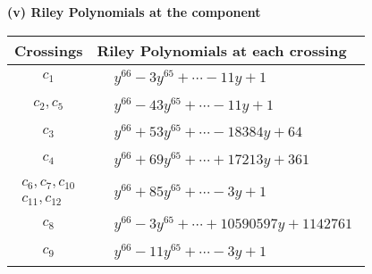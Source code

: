 \documentclass[1p]{elsarticle_modified}
\theoremstyle{definition}
\begin{document}
\newpage\renewcommand{\arraystretch}{1}
\flushleft \textbf{(v) Riley Polynomials at the component}\newline \\
\begin{tabular}{m{50pt}|m{274pt}}
Crossings & \hspace{64pt}Riley Polynomials at each crossing \\
\hline $$\begin{aligned}c_{1}\end{aligned}$$&$\begin{aligned}
&y^{66}-3 y^{65}+\cdots-11 y+1
\end{aligned}$\\
\hline $$\begin{aligned}c_{2},c_{5}\end{aligned}$$&$\begin{aligned}
&y^{66}-43 y^{65}+\cdots-11 y+1
\end{aligned}$\\
\hline $$\begin{aligned}c_{3}\end{aligned}$$&$\begin{aligned}
&y^{66}+53 y^{65}+\cdots-18384 y+64
\end{aligned}$\\
\hline $$\begin{aligned}c_{4}\end{aligned}$$&$\begin{aligned}
&y^{66}+69 y^{65}+\cdots+17213 y+361
\end{aligned}$\\
\hline $$\begin{aligned}c_{6},c_{7},c_{10}\\c_{11},c_{12}\end{aligned}$$&$\begin{aligned}
&y^{66}+85 y^{65}+\cdots-3 y+1
\end{aligned}$\\
\hline $$\begin{aligned}c_{8}\end{aligned}$$&$\begin{aligned}
&y^{66}-3 y^{65}+\cdots+10590597 y+1142761
\end{aligned}$\\
\hline $$\begin{aligned}c_{9}\end{aligned}$$&$\begin{aligned}
&y^{66}-11 y^{65}+\cdots-3 y+1
\end{aligned}$\\
\hline
\end{tabular}\\~\\
\end{document}
